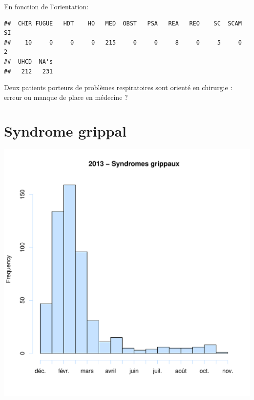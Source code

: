 \documentclass[12pt,english,french,twoside]{report}\usepackage[]{graphicx}\usepackage[]{color}
\makeatletter
\def\maxwidth{ %
  \ifdim\Gin@nat@width>\linewidth
    \linewidth
  \else
    \Gin@nat@width
  \fi
}
\newenvironment{kframe}{%
 \def\at@end@of@kframe{}%
 \ifinner\ifhmode%
  \def\at@end@of@kframe{\end{minipage}}%
  \begin{minipage}{\columnwidth}%
 \fi\fi%
 \def\FrameCommand##1{\hskip\@totalleftmargin \hskip-\fboxsep
 \colorbox{shadecolor}{##1}\hskip-\fboxsep
     \hskip-\linewidth \hskip-\@totalleftmargin \hskip\columnwidth}%
 \MakeFramed {\advance\hsize-\width
   \@totalleftmargin\z@ \linewidth\hsize
   \@setminipage}}%
 {\par\unskip\endMakeFramed%
 \at@end@of@kframe}
\newenvironment{knitrout}{}{} %
\makeatother
\begin{document}
En fonction de l'orientation:
\begin{knitrout}
\color{fgcolor}\begin{kframe}
\begin{verbatim}
##  CHIR FUGUE   HDT    HO   MED  OBST   PSA   REA   REO    SC  SCAM    SI 
##    10     0     0     0   215     0     0     8     0     5     0     2 
##  UHCD  NA's 
##   212   231
\end{verbatim}
\end{kframe}
\end{knitrout}


Deux patients porteurs de problèmes respiratoires sont orienté en chirurgie : erreur ou manque de place en médecine ?

\section{Syndrome grippal}

\begin{knitrout}
\color{fgcolor}
\includegraphics[width=\maxwidth]{figure/grippe} 

\end{knitrout}
\end{document}

